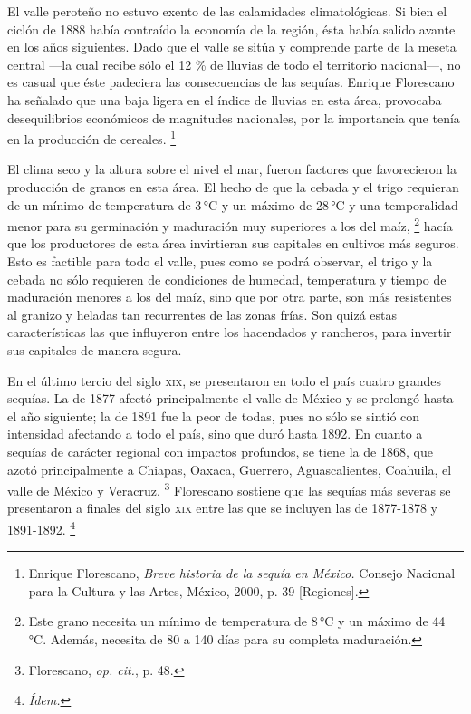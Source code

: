 \documentclass[14pt,twoside,final]{extbook} %
\let\oldfootnote\footnote
\renewcommand\footnote[1]{%
\oldfootnote{\hspace{1mm}#1}}
\begin{document}
El valle peroteño no estuvo exento de las calamidades climatológicas. Si bien el ciclón de 1888 había contraído la economía de la región, ésta había salido avante en los años siguientes. Dado que el valle se sitúa y comprende parte de la meseta central ---la cual recibe sólo el 12 \% de lluvias de todo el territorio nacional---, no es casual que éste padeciera las consecuencias de las sequías. Enrique Florescano ha señalado que una baja ligera en el índice de lluvias en esta área, provocaba desequilibrios económicos de magnitudes nacionales, por la importancia que tenía en la producción de cereales.\footnote{Enrique Florescano, \emph{Breve historia de la sequía en México.} Consejo Nacional para la Cultura y las Artes, México, 2000, p. 39 [Regiones].}

El clima seco y la altura sobre el nivel el mar, fueron factores que favorecieron la producción de granos en esta área. El hecho de que la cebada y el trigo requieran de un mínimo de temperatura de 3\,°C y un máximo de 28\,°C y una temporalidad menor para su germinación y maduración muy superiores a los del maíz,\footnote{Este grano necesita un mínimo de temperatura de 8\,°C y un máximo de 44\,°C. Además, necesita de 80 a 140 días para su completa maduración.} hacía que los productores de esta área invirtieran sus capitales en cultivos más seguros. Esto es factible para todo el valle, pues como se podrá observar, el trigo y la cebada no sólo requieren de condiciones de humedad, temperatura y tiempo de maduración menores a los del maíz, sino que por otra parte, son más resistentes al granizo y heladas tan recurrentes de las zonas frías. Son quizá estas características las que influyeron entre los hacendados y rancheros, para invertir sus capitales de manera segura. \enlargethispage{\baselineskip}

En el último tercio del siglo \textsc{xix}, se presentaron en todo el país cuatro grandes sequías. La de 1877 afectó principalmente el valle de México y se prolongó hasta el año siguiente; la de 1891 fue la peor de todas, pues no sólo se sintió con intensidad afectando a todo el país, sino que duró hasta 1892. En cuanto a sequías de carácter regional con impactos profundos, se tiene la de 1868, que azotó principalmente a Chiapas, Oaxaca, Guerrero, Aguascalientes, Coahuila, el valle de México y Veracruz.\footnote{Florescano, \emph{op. cit.}, p. 48.} Florescano sostiene que las sequías más severas se presentaron a finales del siglo \textsc{xix} entre las que se incluyen las de 1877-1878 y 1891-1892.\footnote{\em Ídem.}
\end{document}
